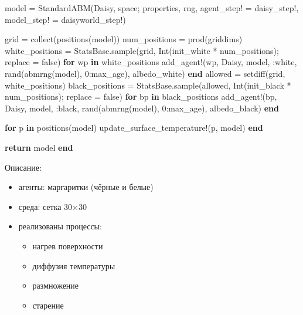 \documentclass[
  english,
  russian,
  12pt,
  a4paper,
  DIV=11,
  numbers=noendperiod]{scrreprt}
\newenvironment{Shaded}{\begin{snugshade}}{\end{snugshade}}
\newcommand{\ConstantTok}[1]{\textcolor[rgb]{0.56,0.35,0.01}{#1}}
\newcommand{\ControlFlowTok}[1]{\textcolor[rgb]{0.00,0.23,0.31}{\textbf{#1}}}
\newcommand{\FloatTok}[1]{\textcolor[rgb]{0.68,0.00,0.00}{#1}}
\newcommand{\FunctionTok}[1]{\textcolor[rgb]{0.28,0.35,0.67}{#1}}
\newcommand{\KeywordTok}[1]{\textcolor[rgb]{0.00,0.23,0.31}{\textbf{#1}}}
\newcommand{\NormalTok}[1]{\textcolor[rgb]{0.00,0.23,0.31}{#1}}
\newcommand{\OperatorTok}[1]{\textcolor[rgb]{0.37,0.37,0.37}{#1}}
\providecommand{\tightlist}{%
  \setlength{\itemsep}{0pt}\setlength{\parskip}{0pt}}
\begin{document}
\begin{Shaded}
\begin{Highlighting}[]
\NormalTok{    model }\OperatorTok{=} \FunctionTok{StandardABM}\NormalTok{(Daisy, space; properties, rng, agent\_step! }\OperatorTok{=}\NormalTok{ daisy\_step!, model\_step! }\OperatorTok{=}\NormalTok{ daisyworld\_step!)}

\NormalTok{    grid }\OperatorTok{=} \FunctionTok{collect}\NormalTok{(}\FunctionTok{positions}\NormalTok{(model))}
\NormalTok{    num\_positions }\OperatorTok{=} \FunctionTok{prod}\NormalTok{(griddims)}
\NormalTok{    white\_positions }\OperatorTok{=}
\NormalTok{        StatsBase.}\FunctionTok{sample}\NormalTok{(grid, }\FunctionTok{Int}\NormalTok{(init\_white }\OperatorTok{*}\NormalTok{ num\_positions); replace }\OperatorTok{=} \ConstantTok{false}\NormalTok{)}
    \ControlFlowTok{for}\NormalTok{ wp }\KeywordTok{in}\NormalTok{ white\_positions}
        \FunctionTok{add\_agent!}\NormalTok{(wp, Daisy, model, }\OperatorTok{:}\NormalTok{white, }\FunctionTok{rand}\NormalTok{(}\FunctionTok{abmrng}\NormalTok{(model), }\FloatTok{0}\OperatorTok{:}\NormalTok{max\_age), albedo\_white)}
    \ControlFlowTok{end}
\NormalTok{    allowed }\OperatorTok{=} \FunctionTok{setdiff}\NormalTok{(grid, white\_positions)}
\NormalTok{    black\_positions }\OperatorTok{=}
\NormalTok{        StatsBase.}\FunctionTok{sample}\NormalTok{(allowed, }\FunctionTok{Int}\NormalTok{(init\_black }\OperatorTok{*}\NormalTok{ num\_positions); replace }\OperatorTok{=} \ConstantTok{false}\NormalTok{)}
    \ControlFlowTok{for}\NormalTok{ bp }\KeywordTok{in}\NormalTok{ black\_positions}
        \FunctionTok{add\_agent!}\NormalTok{(bp, Daisy, model, }\OperatorTok{:}\NormalTok{black, }\FunctionTok{rand}\NormalTok{(}\FunctionTok{abmrng}\NormalTok{(model), }\FloatTok{0}\OperatorTok{:}\NormalTok{max\_age), albedo\_black)}
    \ControlFlowTok{end}

    \ControlFlowTok{for}\NormalTok{ p }\KeywordTok{in} \FunctionTok{positions}\NormalTok{(model)}
        \FunctionTok{update\_surface\_temperature!}\NormalTok{(p, model)}
    \ControlFlowTok{end}

    \ControlFlowTok{return}\NormalTok{ model}
\ControlFlowTok{end}
\end{Highlighting}
\end{Shaded}

Описание:

\begin{itemize}
\item
  агенты: маргаритки (чёрные и белые)
\item
  среда: сетка 30×30
\item
  реализованы процессы:

  \begin{itemize}
  \tightlist
  \item
    нагрев поверхности
  \item
    диффузия температуры
  \item
    размножение
  \item
    старение
  \end{itemize}
\end{itemize}
\end{document}
